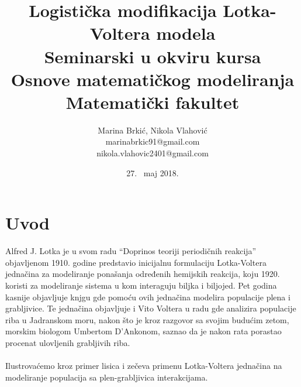 \documentclass[a4paper]{article}
\begin{document}
\title{Logistička modifikacija Lotka-Voltera modela\\
	\small{Seminarski u okviru kursa\\Osnove matematičkog modeliranja\\Matematički fakultet}
}
\author{Marina Brkić, Nikola Vlahović\\marinabrkic91@gmail.com\\nikola.vlahovic2401@gmail.com}
\date{27. ~maj 2018.}
\maketitle
{}
\tableofcontents

\newpage

\section{Uvod}
\label{sec:uvod}

Alfred J. Lotka je u svom radu ``Doprinos teoriji periodičnih reakcija'' objavljenom 1910. godine predstavio
inicijalnu formulaciju Lotka-Voltera jednačina za modeliranje ponašanja određenih hemijskih reakcija, koju
1920. koristi za modeliranje sistema u kom interaguju biljka i biljojed. Pet godina kasnije objavljuje knjgu
gde pomoću ovih jednačina modelira populacije plena i grabljivice. Te jednačina objavljuje i Vito Voltera
u radu gde analizira populacije riba u Jadranskom moru, nakon što je kroz razgovor sa svojim budućim zetom,
morskim biologom Umbertom D'Ankonom, saznao da je nakon rata porastao procenat ulovljenih grabljivih riba.
\\\\
Ilustrovaćemo kroz primer lisica i zečeva primenu Lotka-Voltera jednačina na modeliranje
populacija sa plen-grabljivica interakcijama.
\end{document}
